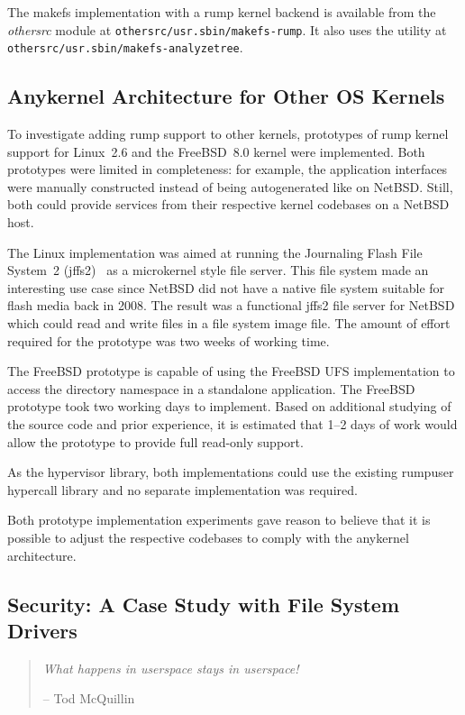The makefs implementation with a rump kernel backend is available
from the \textit{othersrc} module
at \texttt{othersrc/usr.sbin/makefs-rump}.  It also uses the utility at
\texttt{othersrc/usr.sbin/makefs-analyzetree}.


\subsection{Anykernel Architecture for Other OS Kernels}
\label{sect:otherkern}

To investigate adding rump support to other kernels, prototypes
of rump kernel support for Linux~2.6 and the FreeBSD~8.0 kernel
were implemented.  Both prototypes were limited in
completeness: for example, the application interfaces were manually constructed
instead
of being autogenerated like on NetBSD.  Still, both could provide
services from their respective kernel codebases on a NetBSD host.

The Linux implementation was aimed at running the Journaling Flash
File System~2 (jffs2)~\cite{woodhouse:jffs2} as a microkernel
style file server.  This file system made an interesting use case since
NetBSD did not have a native file system suitable for flash media back
in 2008.  The result was a functional jffs2 file server for NetBSD which
could read and write files in a file system image file.  The amount of
effort required for the prototype was two weeks of working time.

The FreeBSD prototype is capable of using the FreeBSD UFS
implementation to access the directory namespace in a standalone
application.  The FreeBSD prototype took two working days to
implement.  Based on additional studying of the source code and prior
experience, it is estimated that 1--2 days of work would allow the
prototype to provide full read-only support.

As the hypervisor library, both implementations could use the
existing rumpuser hypercall library and no separate implementation
was required.

Both prototype implementation experiments gave reason to believe
that it is possible to adjust the respective codebases to comply
with the anykernel architecture.

\subsection{Security: A Case Study with File System Drivers}
\label{sect:securitycase}

\begin{quote}
\emph{What happens in userspace stays in userspace!}

-- Tod McQuillin
\end{quote}

